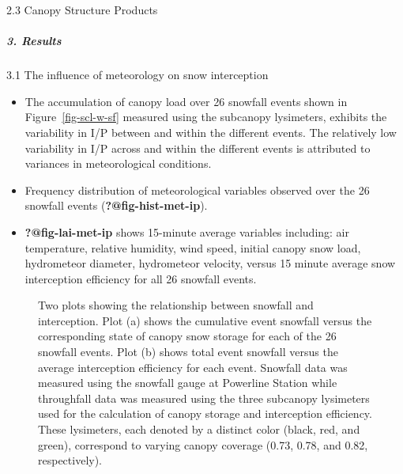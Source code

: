 \documentclass[
  letterpaper,
  DIV=11,
  numbers=noendperiod]{scrartcl}
\let\oldsubparagraph\subparagraph
\renewcommand{\subparagraph}[1]{\oldsubparagraph{#1}\mbox{}}
\begin{document}
2.3 Canopy Structure Products

\subparagraph{3. Results}\label{results}

3.1 The influence of meteorology on snow interception

\begin{itemize}
\item
  The accumulation of canopy load over 26 snowfall events shown in
  Figure~\ref{fig-scl-w-sf} measured using the subcanopy lysimeters,
  exhibits the variability in I/P between and within the different
  events. The relatively low variability in I/P across and within the
  different events is attributed to variances in meteorological
  conditions.
\item
  Frequency distribution of meteorological variables observed over the
  26 snowfall events (\textbf{?@fig-hist-met-ip}).
\item
  \textbf{?@fig-lai-met-ip} shows 15-minute average variables including:
  air temperature, relative humidity, wind speed, initial canopy snow
  load, hydrometeor diameter, hydrometeor velocity, versus 15 minute
  average snow interception efficiency for all 26 snowfall events.
\end{itemize}

\begin{figure}

\begin{minipage}{0.50\linewidth}


\subcaption{\label{fig-scl-w-sf}}

\end{minipage}%
%
\begin{minipage}{0.50\linewidth}


\subcaption{\label{fig-scl-ip}}

\end{minipage}%

\caption{\label{fig-scl}Two plots showing the relationship between
snowfall and interception. Plot (a) shows the cumulative event snowfall
versus the corresponding state of canopy snow storage for each of the 26
snowfall events. Plot (b) shows total event snowfall versus the average
interception efficiency for each event. Snowfall data was measured using
the snowfall gauge at Powerline Station while throughfall data was
measured using the three subcanopy lysimeters used for the calculation
of canopy storage and interception efficiency. These lysimeters, each
denoted by a distinct color (black, red, and green), correspond to
varying canopy coverage (0.73, 0.78, and 0.82, respectively).}

\end{figure}%
\end{document}
